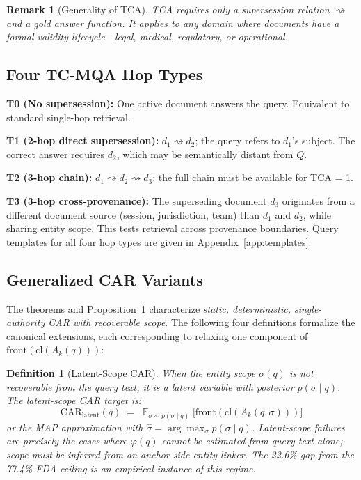 \documentclass[11pt]{article}
\newtheorem{definition}{Definition}
\newtheorem{remark}{Remark}
\begin{document}
\begin{remark}[Generality of TCA]
TCA requires only a supersession relation $\rightsquigarrow$ and a gold answer function. It applies to any domain where documents have a formal validity lifecycle---legal, medical, regulatory, or operational.
\end{remark}

\subsection{Four TC-MQA Hop Types}

\textbf{T0 (No supersession):} One active document answers the query. Equivalent to standard single-hop retrieval.

\textbf{T1 (2-hop direct supersession):} $d_1 \rightsquigarrow d_2$; the query refers to $d_1$'s subject. The correct answer requires $d_2$, which may be semantically distant from $Q$.

\textbf{T2 (3-hop chain):} $d_1 \rightsquigarrow d_2 \rightsquigarrow d_3$; the full chain must be available for TCA = 1.

\textbf{T3 (3-hop cross-provenance):} The superseding document $d_3$ originates from a different document source (session, jurisdiction, team) than $d_1$ and $d_2$, while sharing entity scope. This tests retrieval across provenance boundaries. Query templates for all four hop types are given in Appendix~\ref{app:templates}.

\subsection{Generalized CAR Variants}
\label{sec:generalizations}

The theorems and Proposition~1 characterize \emph{static, deterministic, single-authority CAR with recoverable scope}. The following four definitions formalize the canonical extensions, each corresponding to relaxing one component of $\mathrm{front}(\mathrm{cl}(A_k(q)))$:

\begin{definition}[Latent-Scope CAR]
\label{def:latentcar}
When the entity scope $\sigma(q)$ is not recoverable from the query text, it is a latent variable with posterior $p(\sigma \mid q)$. The \emph{latent-scope CAR target} is:
\[
  \mathrm{CAR}_{\mathrm{latent}}(q) \;=\; \mathop{\mathbb{E}}_{\sigma \sim p(\sigma \mid q)}\!\bigl[\mathrm{front}(\mathrm{cl}(A_k(q,\sigma)))\bigr]
\]
or the MAP approximation with $\hat{\sigma} = \arg\max_\sigma p(\sigma \mid q)$. Latent-scope failures are precisely the cases where $\varphi(q)$ cannot be estimated from query text alone; scope must be inferred from an anchor-side entity linker. The 22.6\% gap from the 77.4\% FDA ceiling is an empirical instance of this regime.
\end{definition}
\end{document}
